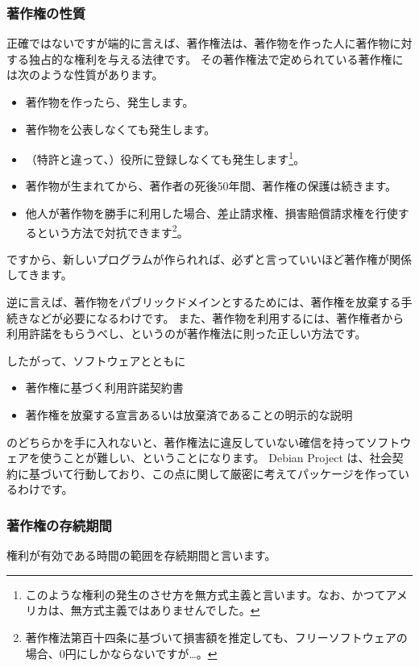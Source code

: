 \documentclass[mingoth,a4paper]{jsarticle}
\begin{document}
\subsubsection{著作権の性質}

正確ではないですが端的に言えば、著作権法は、著作物を作った人に著作物に対する独占的な権利を与える法律です。
その著作権法で定められている著作権には次のような性質があります。

\begin{itemize}
\item 著作物を作ったら、発生します。
\item 著作物を公表しなくても発生します。
\item （特許と違って、）役所に登録しなくても発生します\footnote{このような権利の発生のさせ方を無方式主義と言います。なお、かつてアメリカは、無方式主義ではありませんでした。}。
\item 著作物が生まれてから、著作者の死後50年間、著作権の保護は続きます。
\item 他人が著作物を勝手に利用した場合、差止請求権、損害賠償請求権を行使するという方法で対抗できます\footnote{著作権法第百十四条に基づいて損害額を推定しても、フリーソフトウェアの場合、0円にしかならないですが…。}。
\end{itemize}
ですから、新しいプログラムが作られれば、必ずと言っていいほど著作権が関係してきます。

逆に言えば、著作物をパブリックドメインとするためには、著作権を放棄する手続きなどが必要になるわけです。
また、著作物を利用するには、著作権者から利用許諾をもらうべし、というのが著作権法に則った正しい方法です。

したがって、ソフトウェアとともに
\begin{itemize}
\item 著作権に基づく利用許諾契約書
\item 著作権を放棄する宣言あるいは放棄済であることの明示的な説明
\end{itemize}
のどちらかを手に入れないと、著作権法に違反していない確信を持ってソフトウェアを使うことが難しい、ということになります。
Debian Project は、社会契約\cite{DebianSocialContract}に基づいて行動しており、この点に関して厳密に考えてパッケージを作っているわけです。

\subsubsection{著作権の存続期間}

権利が有効である時間の範囲を存続期間と言います。
\end{document}
